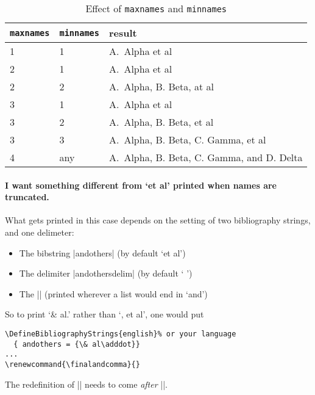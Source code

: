\begin{table}
\begin{tabularx}{\textwidth}{llX}
\toprule
\texttt{maxnames} & \texttt{minnames} & \textsf{result} \\
\midrule
1                 &  1                & A.\ Alpha et al \\
2                 &  1                & A.\ Alpha et al \\
2                 &  2                & A.\ Alpha, B. Beta, at al \\
3                 &  1                & A.\ Alpha et al \\
3                 &  2                & A.\ Alpha, B. Beta, et al \\
3                 &  3                & A.\ Alpha, B. Beta, C. Gamma, et al \\
4                 &  any              & A.\ Alpha, B. Beta, C. Gamma, and D. Delta \\
\bottomrule
\end{tabularx}
\caption{Effect of \texttt{maxnames} and \texttt{minnames}\label{maxnames}}
\end{table}

\paragraph{I want something different from `et al' printed when names are truncated.} What gets printed in this case depends on the setting of two bibliography strings, and one delimeter:
\begin{itemize}
\item The bibstring |andothers| (by default `et al')
\item The delimiter |andothersdelim| (by default ` ')
\item The |\finalandcomma| (printed wherever a list would end in `and')
\end{itemize}
So to print `\& al.' rather than `, et al', one would put
\begin{Verbatim}
\DefineBibliographyStrings{english}% or your language
  { andothers = {\& al\adddot}}
...
\renewcommand{\finalandcomma}{}
\end{Verbatim}
The redefinition of |\finalandcomma| needs to come \emph{after} ||.

